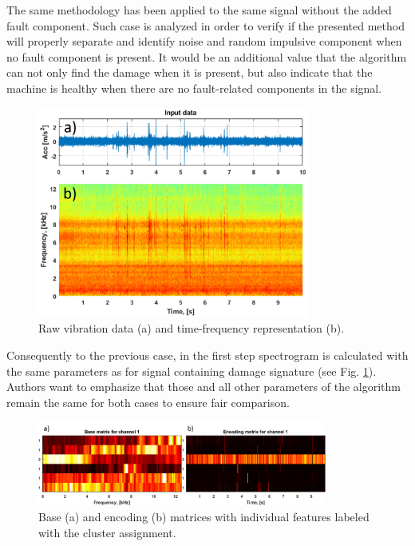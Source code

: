 \documentclass[3p,times]{elsarticle}
\begin{document}
The same methodology has been applied to the same signal without the added fault component. Such case is analyzed in order to verify if the presented method will properly separate and identify noise and random impulsive component when no fault component is present. It would be an additional value that the algorithm can not only find the damage when it is present, but also indicate that the machine is healthy when there are no fault-related components in the signal.

\begin{figure}[ht!]
\centering
\includegraphics[width=0.8\textwidth]{figs/rawk.png}
\caption{Raw vibration data (a) and time-frequency representation (b).}
\label{fig:raw_signal_k}
\end{figure}

Consequently to the previous case, in the first step spectrogram is calculated with the same parameters as for signal containing damage signature (see Fig. \ref{fig:raw_signal_k}). Authors want to emphasize that those and all other parameters of the algorithm remain the same for both cases to ensure fair comparison.

\begin{figure}[ht!]
\centering
\includegraphics[width=0.85\textwidth]{figs/matsk.png}
\caption{Base (a) and encoding (b) matrices with individual features labeled with the cluster assignment.}
\label{fig:NMF_matrixk}
\end{figure}
\end{document}
